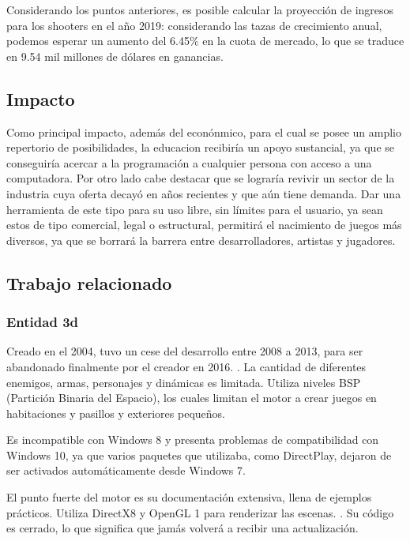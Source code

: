 \documentclass[]{article}
\begin{document}
Considerando los puntos anteriores, es posible calcular la proyecci\'on de ingresos para los shooters en el a\~no 2019: considerando las tazas de crecimiento anual, podemos esperar un aumento del 6.45\% en la cuota de mercado, lo que se traduce en 9.54 mil millones de d\'olares en ganancias. 

\subsection{Impacto}
Como principal impacto, adem\'as del econ\'onmico, para el cual se posee un amplio repertorio de posibilidades, la educacion recibir\'ia un apoyo sustancial, ya que se conseguir\'ia acercar a la programaci\'on a cualquier persona con acceso a una computadora. Por otro lado cabe destacar que se lograr\'ia revivir un sector de la industria cuya oferta decay\'o en a\~nos recientes y que a\'un tiene demanda. Dar una herramienta de este tipo para su uso libre, sin l\'imites para el usuario, ya sean estos de tipo comercial, legal o estructural, permitir\'a el nacimiento de juegos m\'as diversos, ya que se borrar\'a la barrera entre desarrolladores, artistas y jugadores.


\subsection{Trabajo relacionado}

\subsubsection{Entidad 3d}

Creado en el 2004, tuvo un cese del desarrollo entre 2008 a 2013, para ser abandonado finalmente por el creador en 2016. \cite{e3d}. La cantidad de diferentes enemigos, armas, personajes y din\'amicas es limitada. Utiliza niveles BSP (Partici\'on Binaria del Espacio), los cuales limitan el motor a crear juegos en habitaciones y pasillos y exteriores peque\~nos.  
 

Es incompatible con Windows 8 y presenta problemas de compatibilidad con Windows 10, ya que varios paquetes que utilizaba, como DirectPlay, dejaron de ser activados autom\'aticamente desde Windows 7. 



El punto fuerte del motor es su documentaci\'on extensiva, llena de ejemplos pr\'acticos.
Utiliza DirectX8 y OpenGL 1 para renderizar las escenas. \cite{e3d2}.
Su c\'odigo es cerrado, lo que significa que jam\'as volver\'a a recibir una actualizaci\'on. \cite{e3d3}
\end{document}
